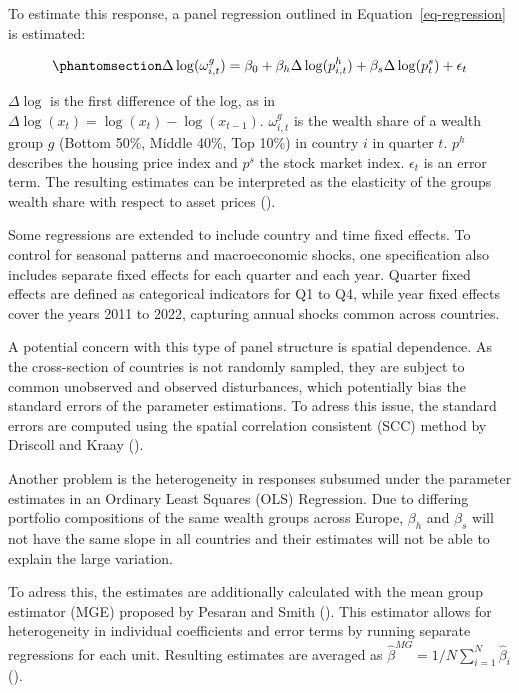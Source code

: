 \documentclass[
  a4paper,
  DIV=11,
  numbers=noendperiod]{scrartcl}
\begin{document}
To estimate this response, a panel regression outlined in
Equation~\ref{eq-regression} is estimated:

\begin{equation}\phantomsection\label{eq-regression}{
\Delta \log (\omega_{i,t}^g) = \beta_0 + \beta_h \Delta \log (p_{i,t}^h) + \beta_s \Delta \log(p^s_{t})+ \epsilon_t
}\end{equation}

\(\Delta \log\) is the first difference of the log, as in
\(\Delta \log (x_t) = \log(x_t) - \log(x_{t-1})\). \(\omega_{i,t}^g\) is
the wealth share of a wealth group \(g\) (Bottom 50\%, Middle 40\%, Top
10\%) in country \(i\) in quarter \(t\). \(p^h\) describes the housing
price index and \(p^s\) the stock market index. \(\epsilon_t\) is an
error term. The resulting estimates can be interpreted as the elasticity
of the groups wealth share with respect to asset prices
().

Some regressions are extended to include country and time fixed effects.
To control for seasonal patterns and macroeconomic shocks, one
specification also includes separate fixed effects for each quarter and
each year. Quarter fixed effects are defined as categorical indicators
for Q1 to Q4, while year fixed effects cover the years 2011 to 2022,
capturing annual shocks common across countries.

A potential concern with this type of panel structure is spatial
dependence. As the cross-section of countries is not randomly sampled,
they are subject to common unobserved and observed disturbances, which
potentially bias the standard errors of the parameter estimations. To
adress this issue, the standard errors are computed using the spatial
correlation consistent (SCC) method by Driscoll and Kraay
().

Another problem is the heterogeneity in responses subsumed under the
parameter estimates in an Ordinary Least Squares (OLS) Regression. Due
to differing portfolio compositions of the same wealth groups across
Europe, \(\beta_h\) and \(\beta_s\) will not have the same slope in all
countries and their estimates will not be able to explain the large
variation.

To adress this, the estimates are additionally calculated with the mean
group estimator (MGE) proposed by Pesaran and Smith
(). This
estimator allows for heterogeneity in individual coefficients and error
terms by running separate regressions for each unit. Resulting estimates
are averaged as \(\hat{\beta}^{MG} = 1/N \sum_{i=1}^N \hat{\beta}_i\)
().
\end{document}
